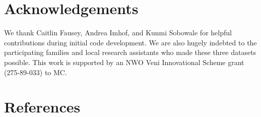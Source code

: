 \documentclass[10pt, letterpaper]{article}
\begin{document}
\hypertarget{acknowledgements}{%
\section{Acknowledgements}\label{acknowledgements}}

We thank Caitlin Fausey, Andrea Imhof, and Kunmi Sobowale for helpful
contributions during initial code development. We are also hugely
indebted to the participating families and local research assistants who
made these three datasets possible. This work is supported by an NWO
Veni Innovational Scheme grant (275-89-033) to MC.

\hypertarget{references}{%
\section{References}\label{references}}

\setlength{\parindent}{-0.1in} 
\setlength{\leftskip}{0.125in}

\noindent
\end{document}
